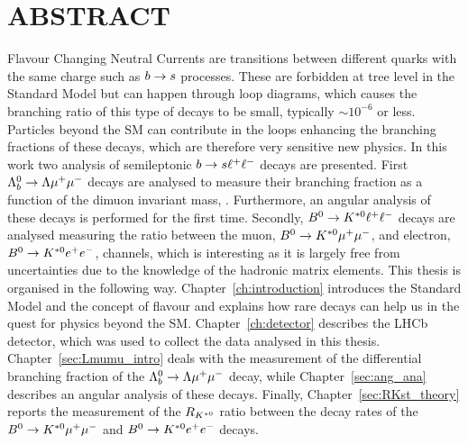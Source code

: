 \chapter*{ABSTRACT}
%
Flavour Changing Neutral Currents are transitions between different quarks with the same charge such as $b\rightarrow s$ processes. These are forbidden at tree level in the Standard Model but
can happen through loop diagrams, which causes the branching ratio of this type of decays
to be small, typically $\sim 10^{-6}$ or less. Particles beyond the SM can contribute in the loops enhancing
the branching fractions of these decays, which are therefore very sensitive new physics.
In this work two analysis of semileptonic $b\rightarrow s\ell^+ \ell^-$ decays are presented.
First $\Lambda^0_b\rightarrow\Lambda\mu^+\mu^-$ decays are analysed to measure their branching fraction as a function
of the dimuon invariant mass, \qsq. Furthermore, an angular analysis of these decays is performed for the first time. 
Secondly, $B^0\rightarrow K^{*0}\ell^+ \ell^-$ decays are analysed measuring the ratio between the muon, $B^0\rightarrow K^{*0}\mu^+\mu^-$, 
and electron, $B^0\rightarrow K^{*0}e^+ e^-$, channels, which is interesting as it is largely free
from uncertainties due to the knowledge of the hadronic matrix elements.
This thesis is organised in the following way. Chapter~\ref{ch:introduction} introduces the Standard Model and 
the concept of flavour and explains how rare decays can help us in the quest for physics beyond the SM.
Chapter~\ref{ch:detector} describes the LHCb detector, which was used to collect the data analysed in this thesis.
Chapter~\ref{sec:Lmumu_intro} deals with the measurement of the differential branching fraction of the $\Lambda^0_b\rightarrow\Lambda\mu^+\mu^-$ 
decay, while Chapter~\ref{sec:ang_ana} describes an angular analysis of these decays.
Finally, Chapter~\ref{sec:RKst_theory} reports the measurement of the $R_{K^{*0}}$ ratio between the decay rates
of the $B^0\rightarrow K^{*0}\mu^+\mu^-$ and $B^0\rightarrow K^{*0}e^+ e^-$ decays.
%
\clearpage

